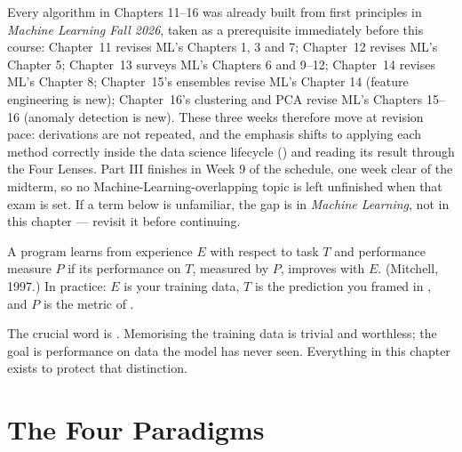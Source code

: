 \begin{conceptbox}
Every algorithm in Chapters 11--16 was already built from first principles in
\emph{Machine Learning Fall 2026}, taken as a prerequisite immediately before
this course: Chapter~11 revises ML's Chapters 1, 3 and 7; Chapter~12 revises
ML's Chapter 5; Chapter~13 surveys ML's Chapters 6 and 9--12; Chapter~14
revises ML's Chapter 8; Chapter~15's ensembles revise ML's Chapter 14 (feature
engineering is new); Chapter~16's clustering and PCA revise ML's Chapters
15--16 (anomaly detection is new). These three weeks therefore move at revision
pace: derivations are not repeated, and the emphasis shifts to applying each
method correctly inside the data science lifecycle () and
reading its result through the Four Lenses. Part III finishes in Week 9 of the
schedule, one week clear of the midterm, so no Machine-Learning-overlapping
topic is left unfinished when that exam is set. If a term below is unfamiliar,
the gap is in \emph{Machine Learning}, not in this chapter --- revisit it
before continuing.
\end{conceptbox}

\begin{definitionbox}
A program learns from experience $E$ with respect to task $T$ and performance
measure $P$ if its performance on $T$, measured by $P$, improves with $E$.
(Mitchell, 1997.) In practice: $E$ is your training data, $T$ is the prediction
you framed in , and $P$ is the metric of .
\end{definitionbox}

The crucial word is . Memorising the training data is trivial
and worthless; the goal is performance on data the model has never seen. Everything
in this chapter exists to protect that distinction.

\section{The Four Paradigms}

